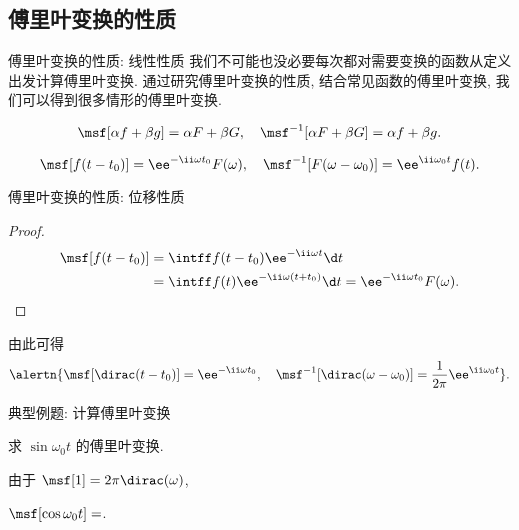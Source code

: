 \subsection{傅里叶变换的性质}


\begin{frame}{傅里叶变换的性质: 线性性质}
	\onslide<+->
	我们不可能也没必要每次都对需要变换的函数从定义出发计算傅里叶变换.
	\onslide<+->
	通过研究傅里叶变换的性质, 结合常见函数的傅里叶变换, 我们可以得到很多情形的傅里叶变换.
	\onslide<+->
	\begin{theorem*}[][线性性质]
		\[
			\msf[\alpha f+\beta g]=\alpha F+\beta G,\quad
			\msf^{-1}[\alpha F+\beta G]=\alpha f+\beta g.
		\]
	\end{theorem*}
	\onslide<+->
	\begin{theorem*}[][位移性质]
		\[
			\msf[f(t-t_0)]=\ee^{-\ii \omega t_0}F(\omega),\quad
			\msf^{-1}[F(\omega-\omega_0)]=\ee^{\ii \omega_0 t}f(t).
		\]
	\end{theorem*}
\end{frame}


\begin{frame}{傅里叶变换的性质: 位移性质}
	\onslide<+->
	\begin{proof}
		\begin{align*}
			\msf[f(t-t_0)]&=\intff f(t-t_0)\ee^{-\ii \omega t}\d t\\
			&=\intff f(t)\ee^{-\ii \omega (t+t_0)}\d t=\ee^{-\ii \omega t_0}F(\omega).
		\end{align*}
		\onslide<+->{%
			逆变换情形类似可得.\qedhere
		}
	\end{proof}
	\onslide<+->
	由此可得
	\[
		\alertn{\msf[\dirac(t-t_0)]=\ee^{-\ii \omega t_0},\quad
		\msf^{-1}[\dirac(\omega-\omega_0)]=\dfrac1{2\pi}\ee^{\ii \omega_0 t}}.
	\]
\end{frame}


\begin{frame}{典型例题: 计算傅里叶变换}
	\onslide<+->
	\begin{example}[nearnext]
		求 $\sin{\omega_0 t}$ 的傅里叶变换.
	\end{example}
	\onslide<+->
	\begin{solution}[nearprev]
		由于 $\msf[1]=2\pi\dirac(\omega)$,
		\bigdel
	\end{solution}

	\onslide<+->
	\begin{exercise}
		$\msf[\cos{\omega_0 t}]=$.
	\end{exercise}
\end{frame}


